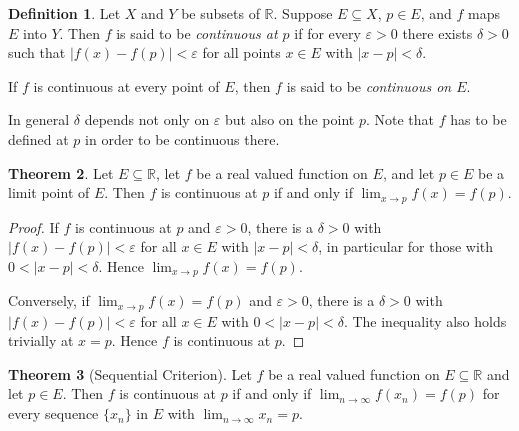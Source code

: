 \documentclass[11pt,a4paper]{article}
\numberwithin{equation}{section}
\theoremstyle{definition}
\newtheorem{thm}{Theorem}[subsection]
\newtheorem{defn}[thm]{Definition}
\begin{document}
\begin{defn}
Let $X$ and $Y$ be subsets of $\mathbb{R}$. Suppose $E\subseteq X$, $p\in E$, and $f$ maps $E$ into $Y$. Then $f$ is said to be \emph{continuous at $p$} if for every $\varepsilon > 0$ there exists $\delta > 0$ such that $|f(x) - f(p)| < \varepsilon$ for all points $x\in E$ with $|x - p| < \delta$.

If $f$ is continuous at every point of $E$, then $f$ is said to be \emph{continuous on $E$}.
\end{defn}

In general $\delta$ depends not only on $\varepsilon$ but also on the point $p$. Note that $f$ has to be defined at $p$ in order to be continuous there.


\begin{thm}
Let $E\subseteq\mathbb{R}$, let $f$ be a real valued function on $E$, and let $p\in E$ be a limit point of $E$. Then $f$ is continuous at $p$ if and only if $\lim_{x\rightarrow p} f(x) = f(p)$.
\end{thm}

\begin{proof}
If $f$ is continuous at $p$ and $\varepsilon>0$, there is a $\delta>0$ with $|f(x) - f(p)|<\varepsilon$ for all $x\in E$ with $|x-p|<\delta$, in particular for those with $0<|x-p|<\delta$. Hence $\lim_{x\rightarrow p} f(x) = f(p)$.

Conversely, if $\lim_{x\rightarrow p} f(x) = f(p)$ and $\varepsilon>0$, there is a $\delta>0$ with $|f(x) - f(p)| < \varepsilon$ for all $x \in E$ with $0<|x - p| < \delta$. The inequality also holds trivially at $x=p$. Hence $f$ is continuous at $p$.
\end{proof}


\begin{thm}[Sequential Criterion]
Let $f$ be a real valued function on $E\subseteq \mathbb{R}$ and let $p\in E$. Then $f$ is continuous at $p$ if and only if $\lim_{n\rightarrow \infty} f(x_n) = f(p)$ for every sequence $\{x_n\}$ in $E$ with $\lim_{n\rightarrow \infty} x_n = p$.
\end{thm}
\end{document}
